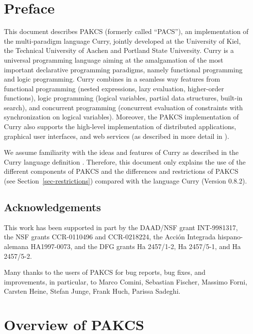 \documentclass[11pt,fleqn]{article}
\begin{document}
\newpage

\section*{Preface}

This document describes PAKCS (formerly called ``PACS''),
an implementation of the multi-paradigm language Curry,
jointly developed at the University of Kiel, the Technical University
of Aachen and Portland State University.
Curry is a universal programming language aiming at the amalgamation
of the most important declarative programming paradigms,
namely functional programming and logic programming.  
Curry combines in a seamless way features from functional programming
(nested expressions, lazy evaluation, higher-order functions),
logic programming (logical variables, partial data structures,
built-in search), and concurrent programming (concurrent evaluation
of constraints with synchronization on logical variables).
Moreover, the PAKCS implementation of Curry also supports
the high-level implementation of distributed applications,
graphical user interfaces, and web services
(as described in more detail in \cite{Hanus99PPDP,Hanus00PADL,Hanus01PADL}).

We assume familiarity with the ideas and features
of Curry as described in the Curry language definition \cite{Hanus06Curry}.
Therefore, this document only explains the use of the different
components of PAKCS
and the differences and restrictions of PAKCS
(see Section~\ref{sec-restrictions})
compared with the language Curry (Version 0.8.2).


\bigskip

\subsection*{Acknowledgements}

This work has been supported in part by the DAAD/NSF grant INT-9981317,
the NSF grants CCR-0110496 and CCR-0218224,
the Acci\'on Integrada hispano-alemana HA1997-0073,
and the DFG grants Ha 2457/1-2, Ha 2457/5-1, and Ha 2457/5-2.

Many thanks to the users of PAKCS for bug reports, bug fixes, and improvements,
in particular, to Marco Comini, Sebastian Fischer, Massimo Forni,
Carsten Heine, Stefan Junge, Frank Huch, Parissa Sadeghi.


\newpage

\section{Overview of PAKCS}
\end{document}
